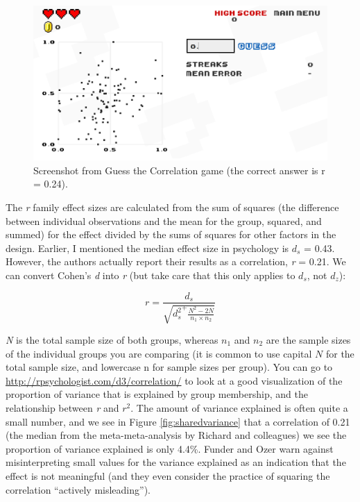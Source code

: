 \documentclass[
  oneside]{book}
\begin{document}
\begin{figure}

{\centering \includegraphics[width=1\linewidth]{images/guesscorrelation} 

}

\caption{Screenshot from Guess the Correlation game (the correct answer is r = 0.24).}\label{fig:guesscorrelation}
\end{figure}

The \emph{r} family effect sizes are calculated from the sum of squares (the difference between individual observations and the mean for the group, squared, and summed) for the effect divided by the sums of squares for other factors in the design. Earlier, I mentioned the median effect size in psychology is \(d_s\) = 0.43. However, the authors actually report their results as a correlation, \emph{r} = 0.21. We can convert Cohen's \emph{d} into \emph{r} (but take care that this only applies to \(d_s\), not \(d_z\)):

\[r = \frac{d_s}{\sqrt{{d_s^{2}}^{+}\frac{N^{2} - 2N}{n_{1} \times n_{2}}}}\]

\emph{N} is the total sample size of both groups, whereas \(n_1\) and \(n_2\) are the sample sizes of the individual groups you are comparing (it is common to use capital \(N\) for the total sample size, and lowercase n for sample sizes per group). You can go to \url{http://rpsychologist.com/d3/correlation/} to look at a good visualization of the proportion of variance that is explained by group membership, and the relationship between \emph{r} and \(r^2\). The amount of variance explained is often quite a small number, and we see in Figure \ref{fig:sharedvariance} that a correlation of 0.21 (the median from the meta-meta-analysis by Richard and colleagues) we see the proportion of variance explained is only 4.4\%. Funder and Ozer \citeyearpar{funder_evaluating_2019} warn against misinterpreting small values for the variance explained as an indication that the effect is not meaningful (and they even consider the practice of squaring the correlation ``actively misleading'').
\end{document}
